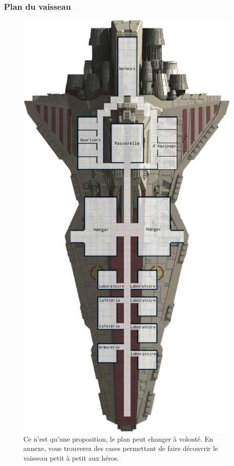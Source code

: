 \onecolumn
\subsubsection{Plan du vaisseau}

\begin{figure}[!h]
	\centering
	\includegraphics[height=0.87\textheight]{_img/dos-au-muur/venator-plan.png}
	\caption{Ce n’est qu’une proposition, le plan peut changer à volonté. En annexe, vous trouverez des cases permettant de faire découvrir le vaisseau petit à petit aux héros.}
\end{figure}

\twocolumn


